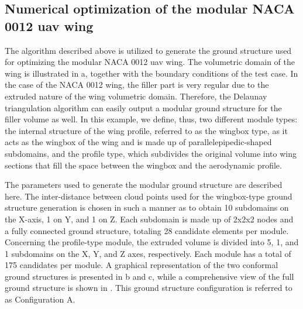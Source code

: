 \subsection{Numerical optimization of the modular NACA 0012 \gls{uav} wing}
The algorithm described above is utilized to generate the ground structure used for optimizing the modular NACA 0012 \gls{uav} wing. The volumetric domain of the wing is illustrated in a, together with the boundary conditions of the test case. In the case of the NACA 0012 wing, the filler part is very regular due to the extruded nature of the wing volumetric domain. Therefore, the Delaunay triangulation algorithm can easily output a modular ground structure for the filler volume as well. In this example, we define, thus, two different module types: the internal structure of the wing profile, referred to as the wingbox type, as it acts as the wingbox of the wing and is made up of parallelepipedic-shaped subdomains, and the profile type, which subdivides the original volume into wing sections that fill the space between the wingbox and the aerodynamic profile.

The parameters used to generate the modular ground structure are described here. The inter-distance between cloud points used for the wingbox-type ground structure generation is chosen in such a manner as to obtain 10 subdomains on the X-axis, 1 on Y, and 1 on Z. Each subdomain is made up of 2x2x2 nodes and a fully connected ground structure, totaling 28 candidate elements per module. Concerning the profile-type module, the extruded volume is divided into 5, 1, and 1 subdomains on the X, Y, and Z axes, respectively. Each module has a total of 175 candidates per module. A graphical representation of the two conformal ground structures is presented in b and c, while a comprehensive view of the full ground structure is shown in . This ground structure configuration is referred to as Configuration A.

